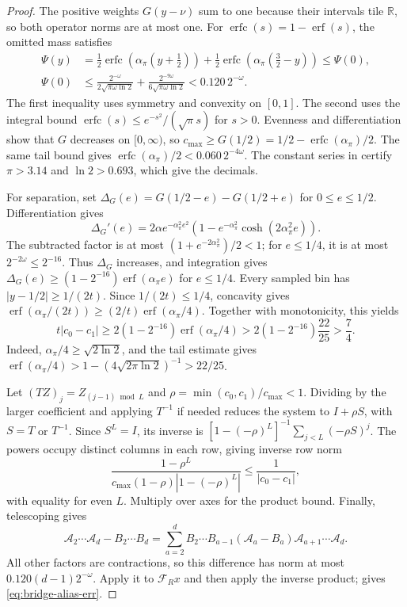 \documentclass[11pt]{article}
\theoremstyle{definition}
\newcommand{\R}{\mathbb{R}}
\newcommand{\cA}{\mathcal{A}}
\newcommand{\cF}{\mathcal{F}}
\newcommand{\erf}{\operatorname{erf}}
\newcommand{\erfc}{\operatorname{erfc}}
\newcommand{\abs}[1]{\left\lvert #1 \right\rvert}
\begin{document}
\begin{proof}
The positive weights $G(y-\nu)$ sum to one because their intervals tile $\R$,
so both operator norms are at most one.
For $\erfc(s)=1-\erf(s)$, the omitted mass satisfies
\begin{align*}
 \Psi(y)&=\tfrac12\erfc(\alpha_\pi(y+\tfrac12))
       +\tfrac12\erfc(\alpha_\pi(\tfrac32-y))\le\Psi(0),\\
 \Psi(0)&\le
 \frac{2^{-\omega}}{2\sqrt{\pi\omega\ln2}}
 +\frac{2^{-9\omega}}{6\sqrt{\pi\omega\ln2}}
 <0.120\,2^{-\omega}.
\end{align*}
The first inequality uses symmetry and convexity on $[0,1]$.
The second uses the integral bound
$\erfc(s)\le e^{-s^2}/(\sqrt\pi s)$ for $s>0$.
Evenness and differentiation show that $G$ decreases on $[0,\infty)$, so
$c_{\max}\ge G(1/2)=1/2-\erfc(\alpha_\pi)/2$.
The same tail bound gives $\erfc(\alpha_\pi)/2<0.060\,2^{-4\omega}$.
The constant series in  certify $\pi>3.14$ and
$\ln2>0.693$, which give the decimals.

For separation, set $\Delta_G(e)=G(1/2-e)-G(1/2+e)$ for $0\le e\le1/2$.
Differentiation gives
\[
 \Delta_G'(e)=2\alpha e^{-\alpha_\pi^2e^2}
       \left(1-e^{-\alpha_\pi^2}\cosh(2\alpha_\pi^2e)\right).
\]
The subtracted factor is at most $(1+e^{-2\alpha_\pi^2})/2<1$;
for $e\le1/4$, it is at most $2^{-2\omega}\le2^{-16}$.
Thus $\Delta_G$ increases, and integration gives
$\Delta_G(e)\ge(1-2^{-16})\erf(\alpha_\pi e)$ for $e\le1/4$.
Every sampled bin has $\abs{y-1/2}\ge1/(2t)$.
Since $1/(2t)\le1/4$, concavity gives
$\erf(\alpha_\pi/(2t))\ge(2/t)\erf(\alpha_\pi/4)$.
Together with monotonicity, this yields
\[
 t\abs{c_0-c_1}
 \ge2(1-2^{-16})\erf(\alpha_\pi/4)
 >2(1-2^{-16})\frac{22}{25}>\frac74.
\]
Indeed, $\alpha_\pi/4\ge\sqrt{2\ln2}$, and the tail estimate gives
$\erf(\alpha_\pi/4)>1-(4\sqrt{2\pi\ln2})^{-1}>22/25$.

Let $(TZ)_j=Z_{(j-1)\bmod L}$ and $\rho=\min(c_0,c_1)/c_{\max}<1$.
Dividing by the larger coefficient and applying $T^{-1}$ if needed reduces
the system to $I+\rho S$, with $S=T$ or $T^{-1}$.
Since $S^L=I$, its inverse is
$[1-(-\rho)^L]^{-1}\sum_{j<L}(-\rho S)^j$.
The powers occupy distinct columns in each row, giving inverse row norm
\[
 \frac{1-\rho^L}
 {c_{\max}(1-\rho)\abs{1-(-\rho)^L}}
 \le\frac1{\abs{c_0-c_1}},
\]
with equality for even $L$. Multiply over axes for the product bound.
Finally, telescoping gives
\[
 \cA_2\cdots\cA_d-B_2\cdots B_d
 =\sum_{a=2}^d B_2\cdots B_{a-1}
       (\cA_a-B_a)\cA_{a+1}\cdots\cA_d.
\]
All other factors are contractions, so this difference has norm at most
$0.120(d-1)2^{-\omega}$.
Apply it to $\cF_Rx$ and then apply the inverse product;
 gives \eqref{eq:bridge-alias-err}.
\end{proof}
\end{document}
